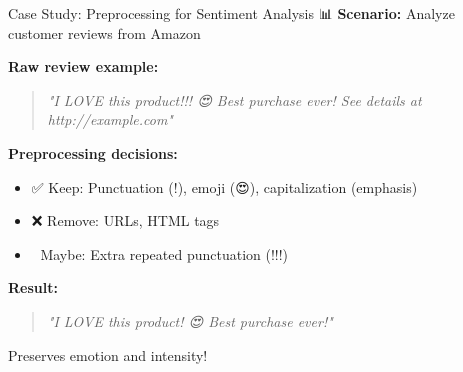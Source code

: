 \documentclass[aspectratio=169]{beamer}
\begin{document}
\begin{frame}{Case Study: Preprocessing for Sentiment Analysis 📊}
    \textbf{Scenario:} Analyze customer reviews from Amazon

    \vspace{0.5em}
    \textbf{Raw review example:}
    \begin{quote}
        \textit{"I LOVE this product!!! 😍 Best purchase ever! See details at http://example.com"}
    \end{quote}

    \vspace{0.5em}
    \textbf{Preprocessing decisions:}
    \begin{itemize}\setlength{\itemsep}{0pt}
        \item ✅ Keep: Punctuation (!), emoji (😍), capitalization (emphasis)
        \item ❌ Remove: URLs, HTML tags
        \item 🤔 Maybe: Extra repeated punctuation (!!!)
    \end{itemize}

    \vspace{0.5em}
    \textbf{Result:}
    \begin{quote}
        \textit{"I LOVE this product! 😍 Best purchase ever!"}
    \end{quote}

    Preserves emotion and intensity!
\end{frame}
\end{document}
